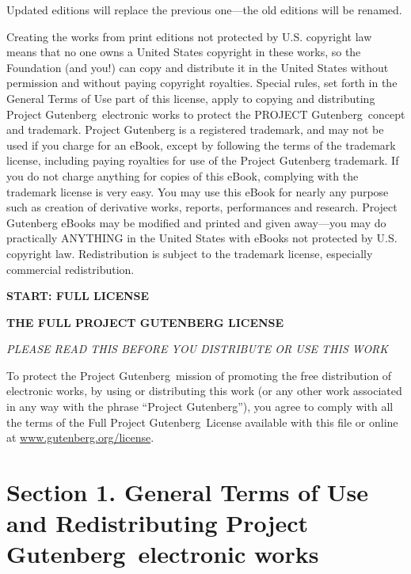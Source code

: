 \documentclass[10pt,a4paper]{book}
\begin{document}
\vspace{1em}

\noindent Updated editions will replace the previous one—the old editions will be renamed.

\vspace{1em}

\noindent Creating the works from print editions not protected by U.S. copyright law means that no one owns a United States copyright in these works, so the Foundation (and you!) can copy and distribute it in the United States without permission and without paying copyright royalties. Special rules, set forth in the General Terms of Use part of this license, apply to copying and distributing Project Gutenberg\texttrademark\ electronic works to protect the PROJECT Gutenberg\texttrademark\ concept and trademark. Project Gutenberg is a registered trademark, and may not be used if you charge for an eBook, except by following the terms of the trademark license, including paying royalties for use of the Project Gutenberg trademark. If you do not charge anything for copies of this eBook, complying with the trademark license is very easy. You may use this eBook for nearly any purpose such as creation of derivative works, reports, performances and research. Project Gutenberg eBooks may be modified and printed and given away—you may do practically ANYTHING in the United States with eBooks not protected by U.S. copyright law. Redistribution is subject to the trademark license, especially commercial redistribution.

\vspace{2em}
\begin{center}
\textbf{START: FULL LICENSE}

\textbf{THE FULL PROJECT GUTENBERG LICENSE}

\textit{PLEASE READ THIS BEFORE YOU DISTRIBUTE OR USE THIS WORK}
\end{center}

To protect the Project Gutenberg\texttrademark\ mission of promoting the free distribution of electronic works, by using or distributing this work (or any other work associated in any way with the phrase “Project Gutenberg”), you agree to comply with all the terms of the Full Project Gutenberg\texttrademark\ License available with this file or online at \url{www.gutenberg.org/license}.

\section*{Section 1. General Terms of Use and Redistributing Project Gutenberg\texttrademark\  electronic works}
\end{document}
